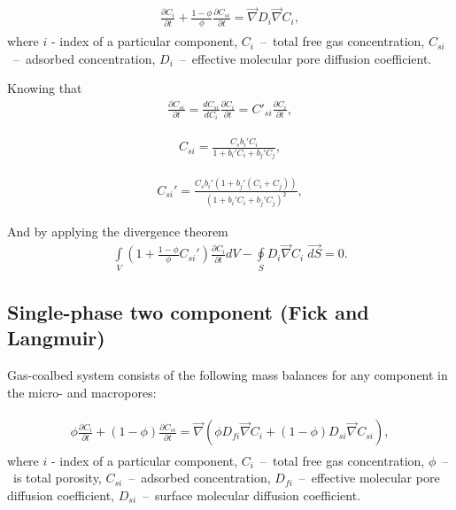 \documentclass[a4paper,14pt,english]{extreport}
\begin{document}
\begin{eqnarray}
\begin{gathered}
\label{eq:diffusuin_multicomp_diff}
\frac{\partial C_{i}}{\partial t} +  \frac{1 - \phi}{\phi} \frac{\partial C_{si}}{\partial t} = \vec{\nabla} D_{i} \vec{\nabla}C_{i},
\end{gathered}
\end{eqnarray}
where $i$ - index of  a particular component, $C_{i}$~--~total free gas concentration, $C_{si}$~--~adsorbed concentration, $D_{i}$~--~effective molecular pore diffusion coefficient.

Knowing that
\begin{eqnarray}
\label{eq:variable_replace}
\frac{\partial C_{si}}{\partial t} =  \frac{dC_{si}}{dC_{i}}\frac{\partial C_{i}}{\partial t} = C'_{si}\frac{\partial C_{i}}{\partial t},
\end{eqnarray}

\begin{eqnarray}
\label{eq:conc_sorption}
C_{si} =  \frac{C_{s} b_{i}' C_{i}}{1+b_{i}'C_{i}+b_{j}'C_{j}},
\end{eqnarray}

\begin{eqnarray}
\label{eq:conc_sorption_deriv}
C_{si}' =  \frac{C_{s}b_{i}' \left(1+b_{j}'\left(C_{i}+C_{j}\right)\right)}{\left(1+b_{i}'C_{i}+b_{j}'C_{j}\right)^2},
\end{eqnarray}

And by applying the divergence theorem 
\begin{eqnarray}
\label{eq:diffusuin_multicomp_integral}
\int \limits_{V} (1+\frac{1 - \phi}{\phi}C_{si}') \frac{\partial C_{i}}{\partial t} dV - \oint \limits_{S} D_{i} \vec{\nabla}C_{i} \; \vec{dS} = 0.
\end{eqnarray}

 \subsection*{Single-phase two component (Fick and Langmuir)}
 Gas-coalbed system consists of the following mass balances for any component in the micro- and macropores:
 
 \begin{eqnarray}
 \begin{gathered}
 \label{eq:diffusuin_multicomp_diff}
  \phi\frac{\partial C_{i}}{\partial t} + \left(1-\phi\right)\frac{\partial C_{si}}{\partial t} = \vec{\nabla} \left(\phi D_{fi} \vec{\nabla}C_{i} + \left(1-\phi \right) D_{si} \vec{\nabla}C_{s i}\right),
   \end{gathered}
 \end{eqnarray}
 where $i$ - index of  a particular component, $C_{i}$~--~total free gas concentration, $\phi$~--~is total porosity, $C_{si}$~--~adsorbed concentration, $D_{fi}$~--~effective molecular pore diffusion coefficient, $D_{si}$~--~surface molecular diffusion coefficient.
 
\end{document}
